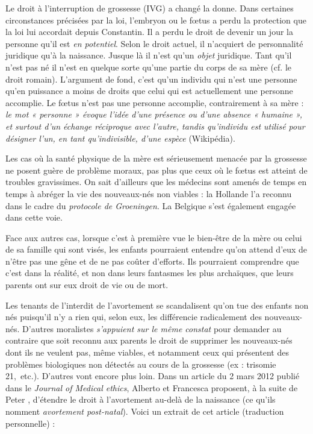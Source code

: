  Le droit à l'interruption de grossesse (IVG) a changé la donne. Dans certaines circonstances précisées par la loi, l'embryon ou le fœtus a perdu la protection que la loi lui accordait depuis Constantin. Il a perdu le droit de devenir un jour la personne qu'il est \emph{en potentiel}. Selon le droit actuel, il n'acquiert de personnalité juridique qu'à la naissance. Jusque là il n'est qu'un \emph{objet} juridique. Tant qu'il n'est pas né il n'est en quelque sorte qu'une partie du corps de sa mère (cf. le droit romain). L'argument de fond, c'est qu'un individu qui n'est une personne qu'en puissance a moins de droits que celui qui est actuellement une personne accomplie. Le fœtus n'est pas une personne accomplie, contrairement à sa mère : {\emph{le mot « personne » évoque l'idée d'une présence ou d'une absence « humaine », et surtout d'un échange réciproque avec l'autre, tandis qu'individu est utilisé pour désigner l'un, en tant qu'indivisible, d'une espèce}} (Wikipédia). 

 Les cas où la santé physique de la mère est sérieusement menacée par la grossesse ne posent guère de problème moraux, pas plus que ceux où le fœtus est atteint de troubles gravissimes. On sait d'ailleurs que les médecins sont amenés de temps en temps à abréger la vie des nouveaux-nés non viables : la Hollande l'a reconnu dans le cadre du \emph{protocole de Groeningen}. La Belgique s'est également engagée dans cette voie. 
 
 Face aux autres cas, lorsque c'est à première vue le bien-être de la mère ou celui de sa famille qui sont visés, les enfants pourraient entendre qu'on attend d'eux de n'être pas une gêne et de ne pas coûter d'efforts. Ils pourraient comprendre que c'est dans la réalité, et non dans leurs fantasmes les plus archaïques, que leurs parents ont sur eux droit de vie ou de mort.

 Les tenants de l'interdit de l'avortement se scandalisent qu'on tue des enfants non nés puisqu'il n'y a rien qui, selon eux, les différencie radicalement des nouveaux-nés. D'autres moralistes \emph{s'appuient sur le même constat} pour demander au contraire que soit reconnu aux parents le droit de supprimer les nouveaux-nés dont ils ne veulent pas, même viables, et notamment ceux qui présentent des problèmes biologiques non détectés au cours de la grossesse (ex : trisomie 21,~etc.). D'autres vont encore plus loin. Dans un article du 2 mars 2012 publié dans le \emph{Journal of Medical ethics}, Alberto  et Francesca  proposent, à la suite de Peter , d'étendre le droit à l'avortement au-delà de la naissance (ce qu'ils nomment \emph{avortement post-natal}). Voici un extrait de cet article (traduction personnelle) :

